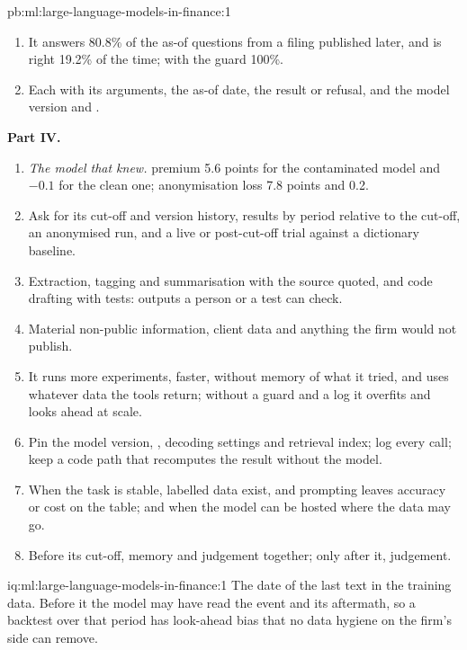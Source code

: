 \begin{solution}{pb:ml:large-language-models-in-finance:1}
\begin{enumerate}[resume]
would have been answered wrongly; it abstains on all 300 unanswerable questions, which would otherwise all get a number.
\item It answers 80.8\% of the as-of questions from a filing published later, and is right 19.2\% of the time; with the
guard 100\%.
\item Each  with its arguments, the as-of date, the result or refusal, and the model version and .
\end{enumerate}
\textbf{Part IV.}
\begin{enumerate}[resume]
\item \emph{The model that knew.}  premium 5.6 points for the contaminated model and $-0.1$ for the clean one;
anonymisation loss 7.8 points and 0.2.
\item Ask for its cut-off and version history, results by period relative to the cut-off, an anonymised run, and a live or
post-cut-off trial against a dictionary baseline.
\item Extraction, tagging and summarisation with the source quoted, and code drafting with tests: outputs a person or a test
can check.
\item Material non-public information, client data and anything the firm would not publish.
\item It runs more experiments, faster, without memory of what it tried, and uses whatever data the tools return; without a
guard and a log it overfits and looks ahead at scale.
\item Pin the model version, , decoding settings and retrieval index; log every call; keep a code path that recomputes
the result without the model.
\item When the task is stable, labelled data exist, and prompting leaves accuracy or cost on the table; and when the model
can be hosted where the data may go.
\item Before its cut-off, memory and judgement together; only after it, judgement.
\end{enumerate}
\end{solution}

\begin{solution}{iq:ml:large-language-models-in-finance:1}
The date of the last text in the training data. Before it the model may have read the event and its aftermath, so a
backtest over that period has look-ahead bias that no data hygiene on the firm's side can remove.
\end{solution}

